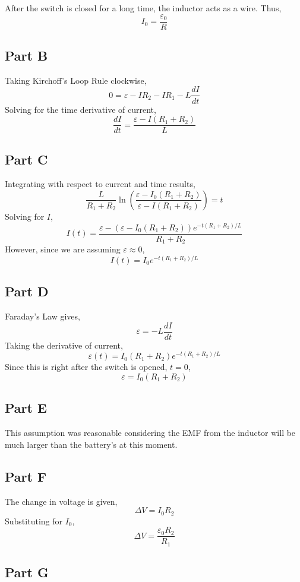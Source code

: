 \documentclass{article}
\begin{document}
After the switch is closed for a long time, the inductor acts as a wire.
Thus,
$$ I_0 = \frac{\varepsilon_0}{R} $$

\subsection*{Part B}

Taking Kirchoff's Loop Rule clockwise,
$$ 0 = \varepsilon - IR_2 - IR_1 - L\frac{dI}{dt} $$
Solving for the time derivative of current,
$$ \frac{dI}{dt} = \frac{\varepsilon - I(R_1 + R_2)}{L} $$

\subsection*{Part C}

Integrating with respect to current and time results,
$$ \frac{L}{R_1 + R_2} \ln\left(\frac{\varepsilon - I_0 (R_1 + R_2)}{\varepsilon
- I (R_1 + R_2)}\right) = t $$
Solving for $I$,
$$ I(t) = \frac{\varepsilon - (\varepsilon - I_0 (R_1 + R_2)) e^{-t(R_1 +
R_2)/L}}{R_1 + R_2} $$
However, since we are assuming $\varepsilon \approx 0$,
$$ I(t) = I_0 e^{-t (R_1 + R_2) / L} $$

\subsection*{Part D}

Faraday's Law gives,
$$ \varepsilon = -L \frac{dI}{dt} $$
Taking the derivative of current,
$$ \varepsilon(t) = I_0 (R_1 + R_2) e^{-t (R_1 + R_2)/L} $$
Since this is right after the switch is opened, $t = 0$,
$$ \varepsilon = I_0 (R_1 + R_2) $$

\subsection*{Part E}

This assumption was reasonable considering the EMF from the inductor will be
much larger than the battery's at this moment.

\subsection*{Part F}

The change in voltage is given,
$$ \Delta V = I_0 R_2 $$
Substituting for $I_0$,
$$ \Delta V = \frac{\varepsilon_0 R_2}{R_1} $$

\subsection*{Part G}
\end{document}

